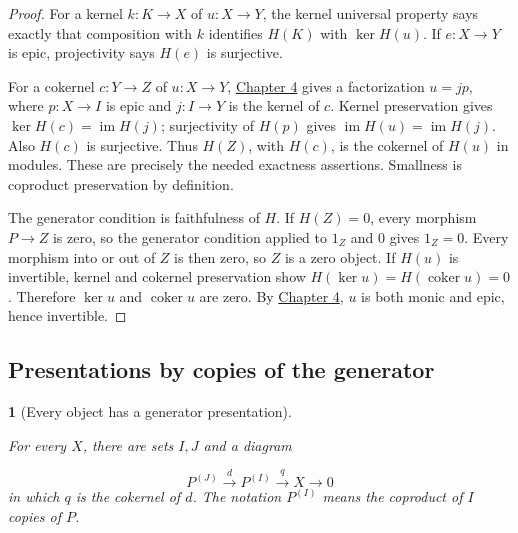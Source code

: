 \documentclass[11pt,a4paper]{article}
\newcommand{\mathheading}{}
\theoremstyle{plain}
\newtheorem*{plainstatement}{\mathheading}
\theoremstyle{definition}
\newenvironment{mathstatement}[3]{\renewcommand{\mathheading}{#1 #2}\begin{plainstatement}[#3]}{\end{plainstatement}}
\begin{document}
\begin{proof}

For a kernel \(k:K\to X\) of \(u:X\to Y\), the kernel universal property says exactly that composition with \(k\) identifies \(H(K)\) with \(\ker H(u)\). If \(e:X\to Y\) is epic, projectivity says \(H(e)\) is surjective.

 
For a cokernel \(c:Y\to Z\) of \(u:X\to Y\), \hyperref[chapter-04]{Chapter 4} gives a factorization \(u=j p\), where \(p:X\to I\) is epic and \(j:I\to Y\) is the kernel of \(c\). Kernel preservation gives \(\ker H(c)=\operatorname{im}H(j)\); surjectivity of \(H(p)\) gives \(\operatorname{im}H(u)=\operatorname{im}H(j)\). Also \(H(c)\) is surjective. Thus \(H(Z)\), with \(H(c)\), is the cokernel of \(H(u)\) in modules. These are precisely the needed exactness assertions. Smallness is coproduct preservation by definition.

 
The generator condition is faithfulness of \(H\). If \(H(Z)=0\), every morphism \(P\to Z\) is zero, so the generator condition applied to \(1_Z\) and \(0\) gives \(1_Z=0\). Every morphism into or out of \(Z\) is then zero, so \(Z\) is a zero object. If \(H(u)\) is invertible, kernel and cokernel preservation show \(H(\ker u)=H(\operatorname{coker}u)=0\). Therefore \(\ker u\) and \(\operatorname{coker}u\) are zero. By \hyperref[chapter-04]{Chapter 4}, \(u\) is both monic and epic, hence invertible.


\end{proof}
 
\subsection{Presentations by copies of the generator}
\label{presentations}

\begin{mathstatement}{Lemma}{8.4}{Every object has a generator presentation}
\label{env-8-4}

For every \(X\), there are sets \(I,J\) and a diagram

 \[P^{(J)}\xrightarrow{d}P^{(I)}\xrightarrow{q}X\longrightarrow0\] 
in which \(q\) is the cokernel of \(d\). The notation \(P^{(I)}\) means the coproduct of \(I\) copies of \(P\).


\par{}\par

\end{mathstatement}
 
\end{document}
